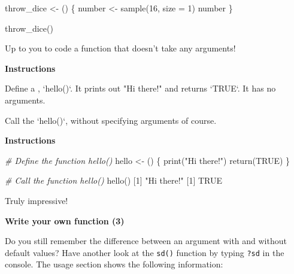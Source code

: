 \documentclass[]{article}
\newcommand{\hlnum}[1]{\textcolor[rgb]{0.816,0.125,0.439}{#1}}%
\newcommand{\hlstr}[1]{\textcolor[rgb]{0.251,0.627,0.251}{#1}}%
\newcommand{\hlcom}[1]{\textcolor[rgb]{0.502,0.502,0.502}{\textit{#1}}}%
\newcommand{\hlstd}[1]{\textcolor[rgb]{0.251,0.251,0.251}{#1}}%
\newcommand{\hlkwc}[1]{\textcolor[rgb]{0.251,0.251,0.251}{#1}}%
\newcommand{\hlkwd}[1]{\textcolor[rgb]{0.878,0.439,0.125}{#1}}%
\newenvironment{Shaded}{\begin{myshaded}}{\end{myshaded}}
\newcommand{\KeywordTok}[1]{\hlkwd{#1}}
\newcommand{\DataTypeTok}[1]{\hlkwc{#1}}
\newcommand{\DecValTok}[1]{\hlnum{#1}}
\newcommand{\StringTok}[1]{\hlstr{#1}}
\newcommand{\CommentTok}[1]{\hlcom{#1}}
\newcommand{\OtherTok}[1]{{#1}}
\newcommand{\NormalTok}[1]{\hlstd{#1}}
\begin{document}
\begin{Shaded}
\begin{Highlighting}[]
\NormalTok{throw_dice <-}\StringTok{ }\NormalTok{() \{}
\NormalTok{number <-}\StringTok{ }\KeywordTok{sample}\NormalTok{(}\DecValTok{1}\OperatorTok{:}\DecValTok{6}\NormalTok{, }\DataTypeTok{size =} \DecValTok{1}\NormalTok{)}
\NormalTok{number}
\NormalTok{\}}

\KeywordTok{throw_dice}\NormalTok{()}
\end{Highlighting}
\end{Shaded}

Up to you to code a function that doesn't take any arguments!

\textbf{Instructions}

\begin{Shaded}
\begin{Highlighting}[]

\OperatorTok{*}\StringTok{ }\NormalTok{Define a }\NormalTok{, }\StringTok{`}\DataTypeTok{hello()}\StringTok{`}\NormalTok{. It prints out }\StringTok{"Hi there!"}\NormalTok{ and returns }\StringTok{`}\DataTypeTok{TRUE}\StringTok{`}\NormalTok{. It has no arguments.}

\OperatorTok{*}\StringTok{ }\NormalTok{Call the } \StringTok{`}\DataTypeTok{hello()}\StringTok{`}\NormalTok{, without specifying arguments of course.}
\end{Highlighting}
\end{Shaded}

\textbf{Instructions}

\begin{Shaded}
\begin{Highlighting}[]
\CommentTok{# Define the function hello()}
\NormalTok{hello <-}\StringTok{ }\NormalTok{() \{}
\KeywordTok{print}\NormalTok{(}\StringTok{"Hi there!"}\NormalTok{)}
\KeywordTok{return}\NormalTok{(}\OtherTok{TRUE}\NormalTok{)}
\NormalTok{\}}


\CommentTok{# Call the function hello()}
\KeywordTok{hello}\NormalTok{()}
\NormalTok{   [}\DecValTok{1}\NormalTok{] }\StringTok{"Hi there!"}
\NormalTok{   [}\DecValTok{1}\NormalTok{] }\OtherTok{TRUE}
\end{Highlighting}
\end{Shaded}

Truly impressive!

\textbf{Write your own function (3)}

Do you still remember the difference between an argument with and
without default values? Have another look at the \texttt{sd()} function
by typing \texttt{?sd} in the console. The usage section shows the
following information:
\end{document}
